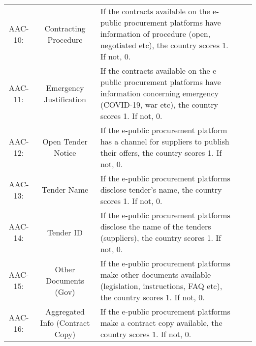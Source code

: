 \documentclass[a4paper, twoside]{report}
\begin{document}
\begin{table}[htbp]
\begin{adjustbox}{max width=\linewidth}
\begin{tabular}{ccp{30em}p{35em}p{31.335em}}
    AAC-10: & \cellcolor[rgb]{ .749,  .749,  .749}Contracting Procedure & \cellcolor[rgb]{ .749,  .749,  .749}If the contracts available on the e-public procurement platforms have information of procedure (open, negotiated etc), the country scores 1. If not, 0. \\
    AAC-11: & \cellcolor[rgb]{ .749,  .749,  .749}Emergency Justification & \cellcolor[rgb]{ .749,  .749,  .749}If the contracts available on the e-public procurement platforms have information concerning emergency (COVID-19, war etc), the country scores 1. If not, 0. \\
    AAC-12: & Open Tender Notice & If the e-public procurement platform has a channel for suppliers to publish their offers, the country scores 1. If not, 0. \\
    AAC-13: & Tender Name & If the e-public procurement platforms disclose tender’s name, the country scores 1. If not, 0. \\
    AAC-14: & Tender ID & If the e-public procurement platforms disclose the name of the tenders (suppliers), the country scores 1. If not, 0. \\
    AAC-15: & Other Documents (Gov) & If the e-public procurement platforms make other documents available (legislation, instructions, FAQ etc), the country scores 1. If not, 0. \\
    AAC-16: & Aggregated Info (Contract Copy) & If the e-public procurement platforms make a contract copy available, the country scores 1. If not, 0. \\
    \bottomrule
    \end{tabular}%
    \end{adjustbox}
  \label{tab:definitions1}%
\end{table}%
\end{document}
